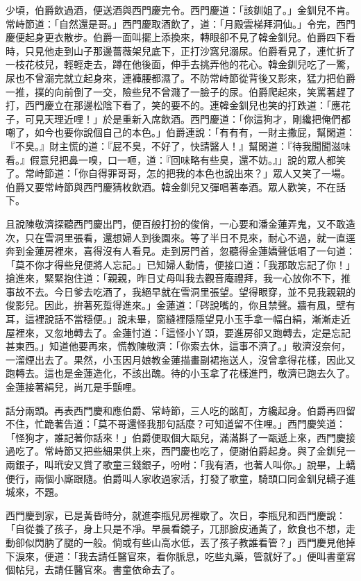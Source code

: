 少頃，伯爵飲過酒，便送酒與西門慶完令。西門慶道：「該釧姐了。」金釧兒不肯。常峙節道：「自然還是哥。」西門慶取酒飲了，道：「月殿雲梯拜洞仙。」令完，西門慶便起身更衣散步。伯爵一面叫擺上添換來，轉眼卻不見了韓金釧兒。伯爵四下看時，只見他走到山子那邊薔薇架兒底下，正打沙窩兒溺尿。伯爵看見了，連忙折了一枝花枝兒，輕輕走去，蹲在他後面，伸手去挑弄他的花心。韓金釧兒吃了一驚，尿也不曾溺完就立起身來，連褲腰都濕了。不防常峙節從背後又影來，猛力把伯爵一推，撲的向前倒了一交，險些兒不曾濺了一臉子的尿。伯爵爬起來，笑罵著趕了打，西門慶立在那邊松陰下看了，笑的要不的。連韓金釧兒也笑的打跌道：「應花子，可見天理近哩！」於是重新入席飲酒。西門慶道：「你這狗才，剛纔把俺們都嘲了，如今也要你說個自己的本色。」伯爵連說：「有有有，一財主撒屁，幫閑道：『不臭。』財主慌的道：『屁不臭，不好了，快請醫人！』幫閑道：『待我聞聞滋味看。』假意兒把鼻一嗅，口一咂，道：『回味略有些臭，還不妨。』」說的眾人都笑了。常峙節道：「你自得罪哥哥，怎的把我的本色也說出來？」眾人又笑了一場。伯爵又要常峙節與西門慶猜枚飲酒。韓金釧兒又彈唱著奉酒。眾人歡笑，不在話下。

且說陳敬濟探聽西門慶出門，便百般打扮的俊俏，一心要和潘金蓮弄鬼，又不敢造次，只在雪洞里張看，還想婦人到後園來。等了半日不見來，耐心不過，就一直逕奔到金蓮房裡來，喜得沒有人看見。走到房門首，忽聽得金蓮嬌聲低唱了一句道：「莫不你才得些兒便將人忘記。」已知婦人動情，便接口道：「我那敢忘記了你！」搶進來，緊緊抱住道：「親親，昨日丈母叫我去觀音庵禮拜，我一心放你不下，推事故不去。今日爹去吃酒了，我絕早就在雪洞里張望。望得眼穿，並不見我親親的俊影兒。因此，拚著死踅得進來。」金蓮道：「硶說嘴的，你且禁聲。牆有風，壁有耳，這裡說話不當穩便。」說未畢，窗縫裡隱隱望見小玉手拿一幅白絹，漸漸走近屋裡來，又忽地轉去了。金蓮忖道：「這怪小丫頭，要進房卻又跑轉去，定是忘記甚東西。」知道他要再來，慌教陳敬濟：「你索去休，這事不濟了。」敬濟沒奈何，一溜煙出去了。果然，小玉因月娘教金蓮描畫副裙拖送人，沒曾拿得花樣，因此又跑轉去。這也是金蓮造化，不該出醜。待的小玉拿了花樣進門，敬濟已跑去久了。金蓮接著絹兒，尚兀是手顫哩。

話分兩頭。再表西門慶和應伯爵、常峙節，三人吃的酩酊，方纔起身。伯爵再四留不住，忙跪著告道：「莫不哥還怪我那句話麼？可知道留不住哩。」西門慶笑道：「怪狗才，誰記著你話來！」伯爵便取個大甌兒，滿滿斟了一甌遞上來，西門慶接過吃了。常峙節又把些細果供上來，西門慶也吃了，便謝伯爵起身。與了金釧兒一兩銀子，叫玳安又賞了歌童三錢銀子，吩咐：「我有酒，也著人叫你。」說畢，上轎便行，兩個小廝跟隨。伯爵叫人家收過家活，打發了歌童，騎頭口同金釧兒轎子進城來，不題。

西門慶到家，已是黃昏時分，就進李瓶兒房裡歇了。次日，李瓶兒和西門慶說：「自從養了孩子，身上只是不凈。早晨看鏡子，兀那臉皮通黃了，飲食也不想，走動卻似閃肭了腿的一般。倘或有些山高水低，丟了孩子教誰看管？」西門慶見他掉下淚來，便道：「我去請任醫官來，看你脈息，吃些丸藥，管就好了。」便叫書童寫個帖兒，去請任醫官來。書童依命去了。

